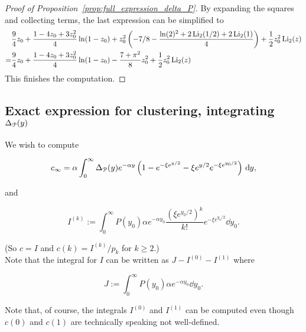\begin{proof}[Proof of Proposition~\ref{prop:full_expression_delta_P}]
By expanding the squares and collecting terms, the last expression can be simplified to
\begin{align*}
&\frac{9}{4} z_0 + \frac{1 - 4 z_0 + 3 z_0^2}{4}\ln(1 - z_0) + 
z_0^2 \left(-7/8 - \frac{\ln(2)^2+2\operatorname{Li}_2(1/2) + 2\operatorname{Li}_2(1)}{4} \right) + 
\frac{1}{2}z_0^2 \operatorname{Li}_2(z) \\
=&\frac{9}{4} z_0 + \frac{1 - 4 z_0 + 3 z_0^2}{4}\ln(1 - z_0) - \frac{7+\pi^2}{8}
z_0^2  + 
\frac{1}{2}z_0^2 \operatorname{Li}_2(z)
\end{align*}
This finishes the computation.

\end{proof}

\subsection{Exact expression for clustering, integrating $\Delta_{{\mathcal P}}(y)$}


We wish to compute

\[   
	c_\infty = \alpha \int_0^{\infty} \Delta_{{\mathcal P}}(y) e^{-\alpha y} \left(1-e^{-\xi e^{y/2}} - \xi e^{y/2} 
	e^{-\xi e^{y_0/2}}\right) \operatorname{\, \mathrm{d}\hspace{-2pt}} y, 
\]

\noindent
and

\[ I^{(k)} := 
\int_0^{\infty} P(y_0) \alpha e^{-\alpha y_0} \frac{\left(\xi e^{y_0/2}\right)^k}{k!} e^{-\xi e^{y_0/2}} {\dd} y_0. \]

\noindent
(So $c = I$ and $c(k) = I^{(k)} / p_k $ for $k\geq 2$.) \\
Note that the integral for $I$ can be written as $J - I^{(0)} - I^{(1)}$ where

\[ J := \int_0^{\infty} P(y_0) \alpha e^{-\alpha y_0} {\dd} y_0. \] 

\noindent
Note that, of course, the integrals $I^{(0)}$ and $I^{(1)}$ can be computed even though $c(0)$ and $c(1)$ are technically
speaking not well-defined.



